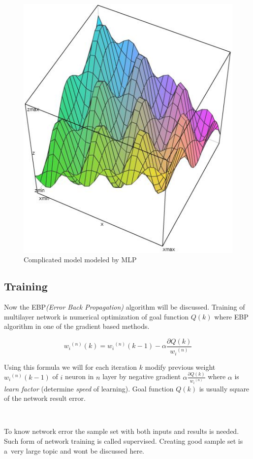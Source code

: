 \begin{figure}[!h]
    \centering
    \includegraphics[scale=0.8]{Media/SolutionGraph.png}
    \caption{Complicated model modeled by MLP}
    \label{fig:SolutionGraph}
\end{figure}

\newpage
\subsection{Training}
\label{sec:Training}

Now the EBP\textit{(Error Back Propagation)} algorithm will be discussed.
Training of multilayer network is numerical optimization of goal function $Q(k)$ where EBP algorithm in one of the gradient based methods.

\begin{mycapequ}[!ht]
    $$ {w_i}^{(n)}(k) = {w_i}^{(n)}(k-1)-\alpha\frac{\partial Q(k)}{{w_i}^{(n)}} $$
    \caption{Error Back Propagation}
    \label{formula:EBP}
\end{mycapequ}

Using this formula we will for each iteration $k$ modify previous weight ${w_i}^{(n)}(k-1)$ of $i$ neuron in $n$ layer by negative gradient $\displaystyle{\alpha\frac{\partial Q(k)}{{w_i}^{(n)}}}$ where $\alpha$ is \textit{learn factor} (determine \textit{speed} of learning).
Goal function $Q(k)$ is usually square of the network result error.

\ 


To know network error the sample set with both inputs and results is needed. Such form of network training is called supervised. Creating good sample set is a~very large topic and wont be discussed here.
